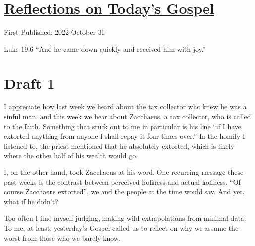 \documentclass[12pt]{article}[titlepage]
\newcommand{\say}[1]{``#1''}
\newcommand{\1}{\={a}}
\newcommand{\2}{\={e}}
\newcommand{\3}{\={\i}}
\newcommand{\4}{\=o}
\newcommand{\5}{\=u}
\newcommand{\6}{\={A}}
\renewcommand{\,}{\textsuperscript{,}}
\begin{document}
\doublespacing
\section{\href{reflections-on-readings-31-ordinary-c-22.html}{Reflections on Today's Gospel}}
First Published: 2022 October 31

Luke 19:6 \say{And he came down quickly and received him with joy.}

\section{Draft 1}
I appreciate how last week we heard about the tax collector who knew he was a sinful man, and this week we hear about Zacchaeus, a tax collector, who is called to the faith.
Something that stuck out to me in particular is his line \say{if I have extorted anything from anyone I shall repay it four times over.}
In the homily I listened to, the priest mentioned that he absolutely extorted, which is likely where the other half of his wealth would go.

I, on the other hand, took Zacchaeus at his word.
One recurring message these past weeks is the contrast between perceived holiness and actual holiness.
\say{Of course Zacchaeus extorted}, we and the people at the time would say.
And yet, what if he didn't?

Too often I find myself judging, making wild extrapolations from minimal data.
To me, at least, yesterday's Gospel called us to reflect on why we assume the worst from those who we barely know.
\end{document}
